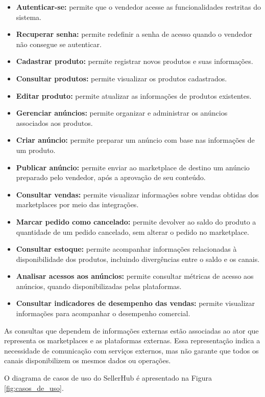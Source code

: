 \begin{itemize}
    \item \textbf{Autenticar-se:} permite que o vendedor acesse as funcionalidades restritas do sistema.
    \item \textbf{Recuperar senha:} permite redefinir a senha de acesso quando o vendedor não consegue se autenticar.
    \item \textbf{Cadastrar produto:} permite registrar novos produtos e suas informações.
    \item \textbf{Consultar produtos:} permite visualizar os produtos cadastrados.
    \item \textbf{Editar produto:} permite atualizar as informações de produtos existentes.
    \item \textbf{Gerenciar anúncios:} permite organizar e administrar os anúncios associados aos produtos.
    \item \textbf{Criar anúncio:} permite preparar um anúncio com base nas informações de um produto.
    \item \textbf{Publicar anúncio:} permite enviar ao marketplace de destino um anúncio preparado pelo vendedor, após a aprovação de seu conteúdo.
    \item \textbf{Consultar vendas:} permite visualizar informações sobre vendas obtidas dos marketplaces por meio das integrações.
    \item \textbf{Marcar pedido como cancelado:} permite devolver ao saldo do produto a quantidade de um pedido cancelado, sem alterar o pedido no marketplace.
    \item \textbf{Consultar estoque:} permite acompanhar informações relacionadas à disponibilidade dos produtos, incluindo divergências entre o saldo e os canais.
    \item \textbf{Analisar acessos aos anúncios:} permite consultar métricas de acesso aos anúncios, quando disponibilizadas pelas plataformas.
    \item \textbf{Consultar indicadores de desempenho das vendas:} permite visualizar informações para acompanhar o desempenho comercial.
\end{itemize}

As consultas que dependem de informações externas estão associadas ao ator que representa os marketplaces e as plataformas externas. Essa representação indica a necessidade de comunicação com serviços externos, mas não garante que todos os canais disponibilizem os mesmos dados ou operações.

O diagrama de casos de uso do SellerHub é apresentado na Figura \ref{fig:casos_de_uso}.

